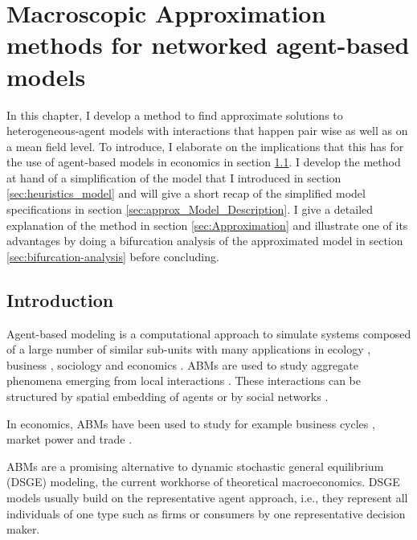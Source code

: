 \chapter{Macroscopic Approximation methods for networked agent-based models}
In this chapter, I develop a method to find approximate solutions to heterogeneous-agent models with interactions that happen pair wise as well as on a mean field level. To introduce, I elaborate on the implications that this has for the use of agent-based models in economics in section \ref{sec:approx_intro}. I develop the method at hand of a simplification of the model that I introduced in section \ref{sec:heuristics_model} and will give a short recap of the simplified model specifications in section \ref{sec:approx_Model_Description}. I give a detailed explanation of the method in section \ref{sec:Approximation} and illustrate one of its advantages by doing a bifurcation analysis of the approximated model in section \ref{sec:bifurcation-analysis} before concluding. 
\section{Introduction}
\label{sec:approx_intro}

Agent-based modeling is a computational approach to simulate systems composed of a large number of similar sub-units with many applications in ecology \citep{Grimm2005}, business \citep{Bonabeau2002}, sociology \citep{Macy2002} and economics \citep{Tesfatsion2006, Hamill2015}.
ABMs are used to study aggregate phenomena emerging from local interactions \citep{Epstein1999}.
These interactions can be structured by spatial embedding of agents or by social networks \citep{Gross2008,Holme2006a,Bargigli2014}.

In economics, ABMs have been used to study for example business cycles \citep{DelliGatti2008}, market power \citep{Tesfatsion2006} and trade \citep{Hamill2015}.

ABMs are a promising alternative to dynamic stochastic general equilibrium (DSGE) modeling, the current workhorse of theoretical macroeconomics. 
DSGE models usually build on the representative agent approach, i.e., they represent all individuals of one type such as firms or consumers by one representative decision maker.

